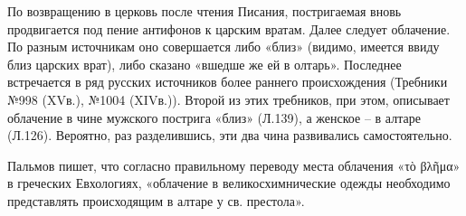По возвращению в церковь после чтения Писания, постригаемая вновь продвигается под пение антифонов к царским вратам.
Далее следует облачение.
По разным источникам оно совершается либо «близ» (видимо, имеется ввиду близ царских врат), либо сказано «вшедше же ей в олтарь».
Последнее встречается в ряд русских источников более раннего происхождения (Требники №998 (XVв.), №1004 (XIVв.)).
Второй из этих требников, при этом, описывает облачение в чине мужского пострига «близ» (Л.139), а женское -- в алтаре (Л.126).
Вероятно, раз разделившись, эти два чина развивались самостоятельно.

Пальмов пишет, что согласно правильному переводу места облачения «τὸ βλῆμα» в греческих Евхологиях, «облачение в великосхимнические одежды необходимо представлять происходящим в алтаре у св. престола»\cite[С.~147]{palmov.postrijeniye.1914}.
